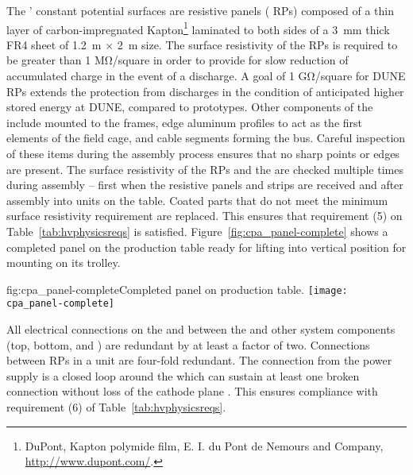 The ' constant potential surfaces are resistive panels ( RPs) composed of a thin layer of carbon-impregnated Kapton\footnote{DuPont\texttrademark{}, Kapton\textsuperscript{\textregistered} polymide film,  E. I. du Pont de Nemours and Company,  \url{http://www.dupont.com/}.} 
 laminated to both sides of a \SI{3}{\milli\meter} thick FR4 sheet of \SI{1.2}{\meter}  $\times$ \SI{2}{\meter} size.  The surface resistivity of the  RPs is required to be greater than 1 M\si{\ohm}/square in order to provide for slow reduction of accumulated charge in the event of a discharge.  A goal of 1 G\si{\ohm}/square for DUNE  RPs extends the protection from discharges in the condition of anticipated higher stored energy at DUNE, compared to prototypes. Other  components of the  include  mounted to the  frames, edge aluminum profiles to act as the first elements of the field cage, and cable segments forming the  bus. Careful inspection of these items during the assembly process ensures that no sharp points or edges are present. The surface resistivity of the  RPs and the  are checked multiple times during assembly -- first when the resistive panels and strips are received and after assembly into  units on the table.  Coated parts that do not meet the minimum surface resistivity requirement are replaced.  This ensures that requirement (5) on Table~\ref{tab:hvphysicsreqs} is satisfied.  Figure~\ref{fig:cpa_panel-complete} shows a completed   panel on the production table ready for lifting into vertical position for mounting on its trolley.

\begin{dunefigure}{fig:cpa_panel-complete}{Completed   panel on production table.}
\texttt{[image: cpa\_panel-complete]}
\end{dunefigure}

All electrical connections on the  and between the  and other  system components (top, bottom, and ) are redundant by at least a factor of two.  Connections between RPs in a  unit are four-fold redundant.  The  connection from the  power supply is a closed loop around the  which can sustain at least one broken connection without loss of the cathode plane .  This ensures compliance with %
requirement (6) of Table~\ref{tab:hvphysicsreqs}.

